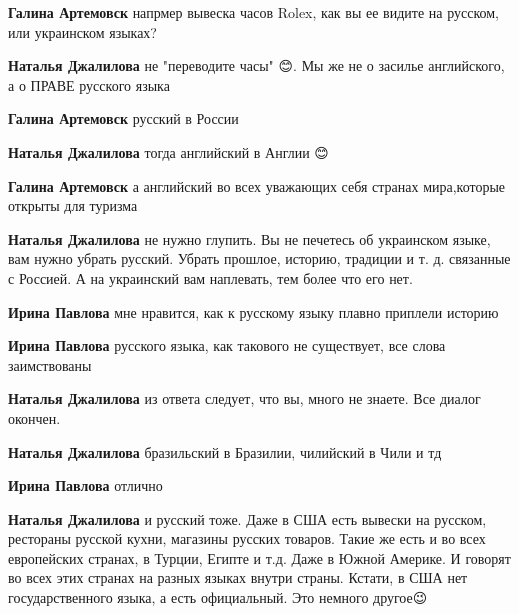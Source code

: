 \begin{itemize}
\begin{itemize}
\textbf{Галина Артемовск} напрмер вывеска часов Rolex, как вы ее видите на русском, или украинском языках?

\textbf{Наталья Джалилова} не "переводите часы" 😊. Мы же не о засилье английского, а о ПРАВЕ русского языка

\textbf{Галина Артемовск} русский в России

\textbf{Наталья Джалилова} тогда английский в Англии 😊

\textbf{Галина Артемовск} а английский во всех уважающих себя странах мира,которые открыты для туризма

\textbf{Наталья Джалилова} не нужно глупить. Вы не печетесь об украинском
языке, вам нужно убрать русский. Убрать прошлое, историю, традиции и т. д.
связанные с Россией. А на украинский вам наплевать, тем более что его нет.

\textbf{Ирина Павлова} мне нравится, как к русскому языку плавно приплели историю

\textbf{Ирина Павлова} русского языка, как такового не существует, все слова заимствованы

\textbf{Наталья Джалилова} из ответа следует, что вы, много не знаете. Все диалог окончен.

\textbf{Наталья Джалилова} бразильский в Бразилии, чилийский в Чили и тд

\textbf{Ирина Павлова} отлично

\textbf{Наталья Джалилова} и русский тоже. Даже в США есть вывески на русском,
рестораны русской кухни, магазины русских товаров. Такие же есть и во всех
европейских странах, в Турции, Египте и т.д. Даже в Южной Америке. И говорят во
всех этих странах на разных языках внутри страны. Кстати, в США нет
государственного языка, а есть официальный. Это немного другое😉



\end{itemize}
\end{itemize}
